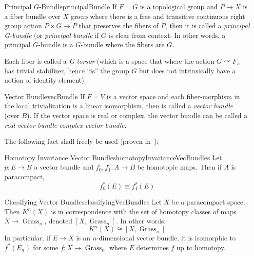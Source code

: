 \documentclass{book}
\newenvironment{Proof}[1][]
  {\begin{ProofTcb}[#1]}
  {\end{ProofTcb}}
\newcommand{\qn}{\quad\newline}
\newcommand{\Grass}{{\operatorname{Grass}}}
\newcommand{\actson}{\curvearrowright}
\begin{document}
\begin{defn}{Principal $G$-Bundle}{principalBundle}
	If $F = G$ is a topological group and $P \to X$ is a fiber bundle over $X$ group where there is a free and
	transitive continuous
	right group action $P\times G \to P$ that preserves the fibers of $P$, then it is called a \emph{principal
	G-bundle} (or \emph{principal bundle} if $G$ is clear from context. In other words, a principal $G$-bundle
  is a $G$-bundle where the fibers are $G$.

	\qn
	Each fiber is called a \emph{G-torsor} (which is a space that where the action $G\actson F_x$ has trivial
	stabilizer, hence ``is'' the group $G$ but does not intrinsically have a notion of identity element)
\end{defn}

\begin{defn}{Vector Bundle}{vecBundle}
	If $F =V$ is a vector space and each
	fiber-morphism in the local trivialization is a linear isomorphism, then is called a \emph{vector bundle}
	(over $B$). If the vector space is real or complex, the vector bundle can be called a \emph{real vector
	bundle} \emph{complex vector bundle}.
\end{defn}

The following fact shall freely be used (proven in~\cite{NateKTheory}):

\begin{thm}{Homotopy Invariance Vector Bundles}{homotopyInvarianceVecBundles}
	Let $p: E \to B$ a vector bundle and $f_0,f_1: A \to B$ be homotopic maps. Then if $A$ is paracompact,
	\[
		f_0^*(E) \cong f_1^*(E)
	\]
\end{thm}

\begin{Proof}
  \cite[section~1.2]{NateKTheory}
\end{Proof}

\begin{thm}{Classifying Vector Bundles}{classifyingVecBundles}
	Let $X$ be a paracompact space. Then $K^n(X)$ is in correspondence with the set of homotopy
	classes of maps $X \to \Grass_n$, denoted $[X, \Grass_n]$. In other words:
	\[
		K^n(X) \cong [X,\Grass_n]
	\]
	In particular, if $E \to X$ is an $n$-dimensional vector bundle, it is isomorphic to $f^*(E_n)$ for some
	$f: X \to \Grass_n$ where $E$ determines $f$ up to homotopy.
\end{thm}
\end{document}
